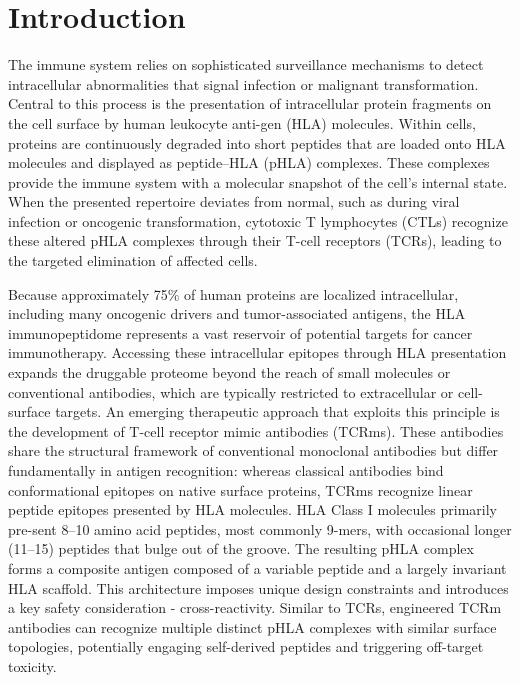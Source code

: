\documentclass[unnumsec,webpdf,contemporary,large]{oup-authoring-template}%
\theoremstyle{thmstyleone}%
\theoremstyle{thmstyletwo}%
\theoremstyle{thmstylethree}%
\begin{document}
\maketitle


\section{Introduction}
    The immune system relies on sophisticated surveillance mechanisms to detect intracellular abnormalities that signal infection or malignant transformation. Central to this process is the presentation of intracellular protein fragments on the cell surface by human leukocyte anti-gen (HLA) molecules. Within cells, proteins are continuously degraded into short peptides that are loaded onto HLA molecules and displayed as peptide–HLA (pHLA) complexes. These complexes provide the immune system with a molecular snapshot of the cell’s internal state. When the presented repertoire deviates from normal, such as during viral infection or oncogenic transformation, cytotoxic T lymphocytes (CTLs) recognize these altered pHLA complexes through their T-cell receptors (TCRs), leading to the targeted elimination of affected cells.
    
    Because approximately 75\% of human proteins are localized intracellular, including many oncogenic drivers and tumor-associated antigens, the HLA immunopeptidome represents a vast reservoir of potential targets for cancer immunotherapy. Accessing these intracellular epitopes through HLA presentation expands the druggable proteome beyond the reach of small molecules or conventional antibodies, which are typically restricted to extracellular or cell-surface targets. An emerging therapeutic approach that exploits this principle is the development of T-cell receptor mimic antibodies (TCRms). These antibodies share the structural framework of conventional monoclonal antibodies but differ fundamentally in antigen recognition: whereas classical antibodies bind conformational epitopes on native surface proteins, TCRms recognize linear peptide epitopes presented by HLA molecules. HLA Class I molecules primarily pre-sent 8–10 amino acid peptides, most commonly 9-mers, with occasional longer (11–15) peptides that bulge out of the groove. The resulting pHLA complex forms a composite antigen composed of a variable peptide and a largely invariant HLA scaffold. This architecture imposes unique design constraints and introduces a key safety consideration - cross-reactivity. Similar to TCRs, engineered TCRm antibodies can recognize multiple distinct pHLA complexes with similar surface topologies, potentially engaging self-derived peptides and triggering off-target toxicity.
    
\end{document}
